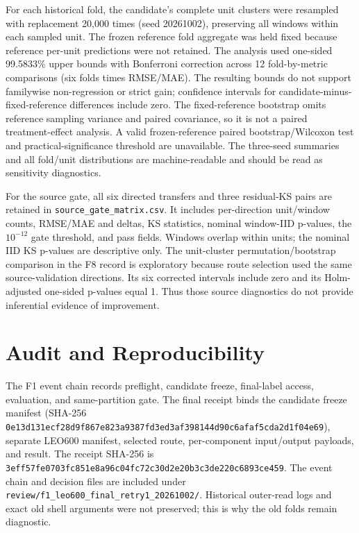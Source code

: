 \documentclass[journal]{IEEEtran}
\begin{document}
For each historical fold, the candidate's complete unit clusters were resampled with replacement 20,000 times (seed 20261002), preserving all windows within each sampled unit. The frozen reference fold aggregate was held fixed because reference per-unit predictions were not retained. The analysis used one-sided 99.5833\% upper bounds with Bonferroni correction across 12 fold-by-metric comparisons (six folds times RMSE/MAE). The resulting bounds do not support familywise non-regression or strict gain; confidence intervals for candidate-minus-fixed-reference differences include zero. The fixed-reference bootstrap omits reference sampling variance and paired covariance, so it is not a paired treatment-effect analysis. A valid frozen-reference paired bootstrap/Wilcoxon test and practical-significance threshold are unavailable. The three-seed summaries and all fold/unit distributions are machine-readable and should be read as sensitivity diagnostics.

For the source gate, all six directed transfers and three residual-KS pairs are retained in \texttt{source\_gate\_matrix.csv}. It includes per-direction unit/window counts, RMSE/MAE and deltas, KS statistics, nominal window-IID p-values, the $10^{-12}$ gate threshold, and pass fields. Windows overlap within units; the nominal IID KS p-values are descriptive only. The unit-cluster permutation/bootstrap comparison in the F8 record is exploratory because route selection used the same source-validation directions. Its six corrected intervals include zero and its Holm-adjusted one-sided p-values equal 1. Thus those source diagnostics do not provide inferential evidence of improvement.

\section{Audit and Reproducibility}\label{sec:audit}
The F1 event chain records preflight, candidate freeze, final-label access, evaluation, and same-partition gate. The final receipt binds the candidate freeze manifest (SHA-256 \texttt{0e13d131\allowbreak ecf28d9f\allowbreak 867e823a\allowbreak 9387fd3e\allowbreak d3af3981\allowbreak 44d90c6a\allowbreak faf5cda2\allowbreak d1f04e69}), separate LEO600 manifest, selected route, per-component input/output payloads, and result. The receipt SHA-256 is \texttt{3eff57fe\allowbreak 0703fc85\allowbreak 1e8a96c0\allowbreak 4fc72c30\allowbreak d2e20b3c\allowbreak 3de220c6\allowbreak 893ce459}. The event chain and decision files are included under \nolinkurl{review/f1_leo600_final_retry1_20261002/}. Historical outer-read logs and exact old shell arguments were not preserved; this is why the old folds remain diagnostic.
\end{document}

